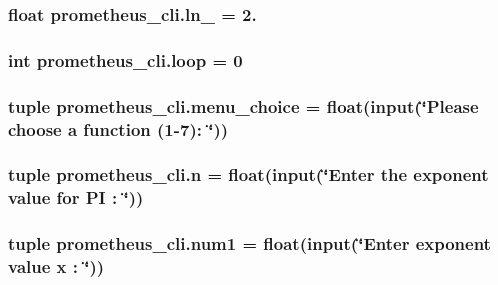 \subsubsection[{ln\+\_\+10}]{\setlength{\rightskip}{0pt plus 5cm}float prometheus\+\_\+cli.\+ln\+\_ = 2.}\label{namespaceprometheus__cli_a46ac4e09c2a42fb1e4fa853ee0df0e5e}
\hypertarget{namespaceprometheus__cli_a36714b394f122ad75824a9f836776164}{}
\subsubsection[{loop}]{\setlength{\rightskip}{0pt plus 5cm}int prometheus\+\_\+cli.\+loop = 0}\label{namespaceprometheus__cli_a36714b394f122ad75824a9f836776164}
\hypertarget{namespaceprometheus__cli_af508c0b6bedd92457532fb08d8adc604}{}
\subsubsection[{menu\+\_\+choice}]{\setlength{\rightskip}{0pt plus 5cm}tuple prometheus\+\_\+cli.\+menu\+\_\+choice = float(input(\char`\"{}Please choose a function (1-\/7)\+: \char`\"{}))}\label{namespaceprometheus__cli_af508c0b6bedd92457532fb08d8adc604}
\hypertarget{namespaceprometheus__cli_a37dbc023f3004215220d7b8cf5973f36}{}
\subsubsection[{n}]{\setlength{\rightskip}{0pt plus 5cm}tuple prometheus\+\_\+cli.\+n = float(input(\char`\"{}Enter the exponent {\bf value} for P\+I \+: \char`\"{}))}\label{namespaceprometheus__cli_a37dbc023f3004215220d7b8cf5973f36}
\hypertarget{namespaceprometheus__cli_a2a1a1ea44e6d5584a9d6d27e94961ebb}{}
\subsubsection[{num1}]{\setlength{\rightskip}{0pt plus 5cm}tuple prometheus\+\_\+cli.\+num1 = float(input(\char`\"{}Enter exponent {\bf value} {\bf x} \+: \char`\"{}))}\label{namespaceprometheus__cli_a2a1a1ea44e6d5584a9d6d27e94961ebb}
\hypertarget{namespaceprometheus__cli_a7b5fe602ea3132f041300f7ba22775f2}{}
